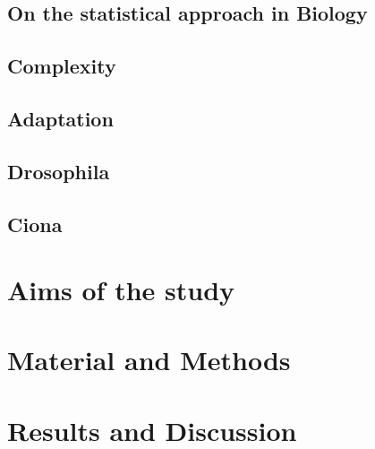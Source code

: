 \documentclass[officiallayout]{tktla_modified}
\begin{document}
\section{On the statistical approach in Biology}
	
	\clearpage 	
	

\section{Complexity}
	
	\clearpage 
\section{Adaptation}
	
	\clearpage
\section{Drosophila}
	
	\clearpage
\section{Ciona}
	
	\clearpage

\chapter{Aims of the study}



\chapter{Material and Methods}


	
\chapter{Results and Discussion}



\end{document}
